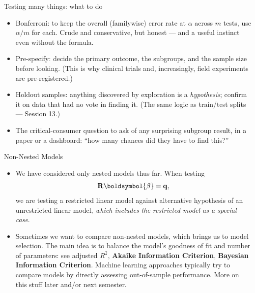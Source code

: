 \documentclass[aspectratio=169,11pt]{beamer}
\begin{document}
\begin{frame}{Testing many things: what to do}
\begin{itemize}
	\item \alert{Bonferroni}: to keep the overall (familywise) error rate at
	$\alpha$ across $m$ tests, use $\alpha/m$ for each. Crude and conservative, but
	honest --- and a useful instinct even without the formula.

	\item \alert{Pre-specify}: decide the primary outcome, the subgroups, and the
	sample size before looking. (This is why clinical trials and, increasingly, field
	experiments are pre-registered.)

	\item \alert{Holdout samples}: anything discovered by exploration is a
	\emph{hypothesis}; confirm it on data that had no vote in finding it. (The same
	logic as train/test splits --- Session 13.)

	\item The critical-consumer question to ask of any surprising subgroup result,
	in a paper or a dashboard: \alert{``how many chances did they have to find
	this?''}
\end{itemize}
\end{frame}


\begin{frame}{Non-Nested Models}
\begin{itemize}
	\item We have considered only nested models thus far. When testing \[
	{\bf R} \boldsymbol{\beta} = {\bf q}, 
	\]
	we are testing a restricted linear model against alternative hypothesis of 
	an unrestricted linear model, \emph{ which includes the restricted model as a special
	case}.

	\medskip
	\item Sometimes we want to compare non-nested models, which brings us to
	model selection. The main idea
	is to balance the model's goodness of fit and number of parameters: see
	adjusted $R^2$, {\bf Akaike Information Criterion}, {\bf Bayesian
	Information Criterion}. Machine learning approaches typically
	try to compare models by directly assessing out-of-sample performance.
	 More on this stuff later and/or next semester.

\end{itemize}
\end{frame}





\end{document}
